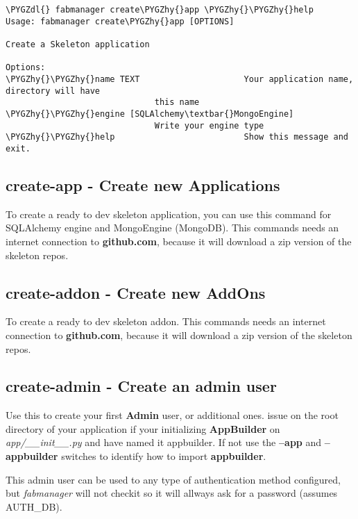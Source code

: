 \documentclass[letterpaper,10pt,english]{sphinxmanual}
\def\PYGZdl{\char`\$}
\def\PYGZhy{\char`\-}
\begin{document}
\begin{Verbatim}[commandchars=\\\{\}]
\PYGZdl{} fabmanager create\PYGZhy{}app \PYGZhy{}\PYGZhy{}help
Usage: fabmanager create\PYGZhy{}app [OPTIONS]

Create a Skeleton application

Options:
\PYGZhy{}\PYGZhy{}name TEXT                     Your application name, directory will have
                              this name
\PYGZhy{}\PYGZhy{}engine [SQLAlchemy\textbar{}MongoEngine]
                              Write your engine type
\PYGZhy{}\PYGZhy{}help                          Show this message and exit.
\end{Verbatim}


\subsection{\textbf{create-app} - Create new Applications}
\label{fabmanager:create-app-create-new-applications}
To create a ready to dev skeleton application, you can use this command for SQLAlchemy engine and MongoEngine (MongoDB).
This commands needs an internet connection to \textbf{github.com}, because it will download a zip version of the skeleton repos.


\subsection{\textbf{create-addon} - Create new AddOns}
\label{fabmanager:create-addon-create-new-addons}
To create a ready to dev skeleton addon.
This commands needs an internet connection to \textbf{github.com}, because it will download a zip version of the skeleton repos.


\subsection{\textbf{create-admin} - Create an admin user}
\label{fabmanager:create-admin-create-an-admin-user}
Use this to create your first \textbf{Admin} user, or additional ones. issue on the root directory of your application
if your initializing \textbf{AppBuilder} on \emph{app/\_\_init\_\_.py} and have named it appbuilder. If not use the \textbf{--app} and
\textbf{--appbuilder} switches to identify how to import \textbf{appbuilder}.

This admin user can be used to any type of authentication method configured, but \emph{fabmanager} will not checkit so
it will allways ask for a password (assumes AUTH\_DB).
\end{document}
